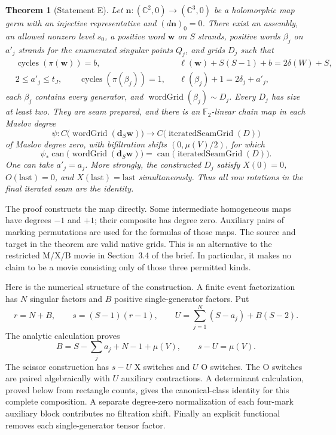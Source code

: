 \documentclass[11pt,a4paper]{article}
\newtheorem{theorem}{Theorem}
\theoremstyle{remark}
\begin{document}
\begin{theorem}[Statement E]\label{thm:E}
Let $\boldsymbol n:(\mathbb C^2,0)\to(\mathbb C^3,0)$ be a holomorphic
map germ with an injective representative and $(d\boldsymbol n)_0=0$.
There exist an assembly, an allowed nonzero level $s_0$, a positive word
$\mathbf w$ on $S$ strands, positive words $\beta_j$ on $a'_j$ strands
for the enumerated singular points $Q_j$, and grids $D_j$ such that
\begin{align*}
 &\operatorname{cycles}(\pi(\mathbf w))=b,
 &&\ell(\mathbf w)+S(S-1)+b=2\delta(W)+S,\\
 &2\le a'_j\le t_J,\qquad \operatorname{cycles}(\pi(\beta_j))=1,
 &&\ell(\beta_j)+1=2\delta_j+a'_j,
\end{align*}
each $\beta_j$ contains every generator, and
$\operatorname{wordGrid}(\beta_j)\sim D_j$.
Every $D_j$ has size at least two.  They are seam prepared, and there
is an $\mathbb F_2$-linear chain map in each Maslov degree
\[
 \psi:C\bigl(\operatorname{wordGrid}(\mathbf d_S\mathbf w)\bigr)
       \longrightarrow C\bigl(\operatorname{iteratedSeamGrid}(D)\bigr)
\]
of Maslov degree zero, with bifiltration shifts $(0,\mu(V)/2)$, for which
\[
 \psi_*\operatorname{can}
       \bigl(\operatorname{wordGrid}(\mathbf d_S\mathbf w)\bigr)
   =\operatorname{can}\bigl(\operatorname{iteratedSeamGrid}(D)\bigr).
\]
One can take $a'_j=a_j$.  More strongly, the constructed $D_j$ satisfy
$X(0)=0$, $O(\mathrm{last})=0$, and
$X(\mathrm{last})=\mathrm{last}$ simultaneously.  Thus all row
rotations in the final iterated seam are the identity.
\end{theorem}

The proof constructs the map directly.  Some intermediate homogeneous
maps have degrees $-1$ and $+1$; their composite has degree zero.
Auxiliary pairs of marking permutations are used for the formulas
of those maps.  The source and target in the theorem are valid native
grids.  This is an alternative to the restricted M/X/B movie in
Section~3.4 of the brief.  In particular, it makes no claim to be a
movie consisting only of those three permitted kinds.

Here is the numerical structure of the construction.  A finite event
factorization has $N$ singular factors and $B$ positive single-generator
factors.  Put
\begin{equation}\label{eq:global-counts}
 r=N+B,\qquad s=(S-1)(r-1),\qquad
 U=\sum_{j=1}^N(S-a_j)+B(S-2).
\end{equation}
The analytic calculation proves
\begin{equation}\label{eq:B-intro}
 B=S-\sum_j a_j+N-1+\mu(V),
 \qquad s-U=\mu(V).
\end{equation}
The scissor construction has $s-U$ X switches and $U$ O switches.
The O switches are paired algebraically with $U$ auxiliary
contractions.  A determinant calculation, proved below from rectangle
counts, gives the canonical-class identity for this complete
composition.  A separate degree-zero normalization of each four-mark
auxiliary block contributes no filtration shift.  Finally an explicit
functional removes each single-generator tensor factor.
\end{document}
